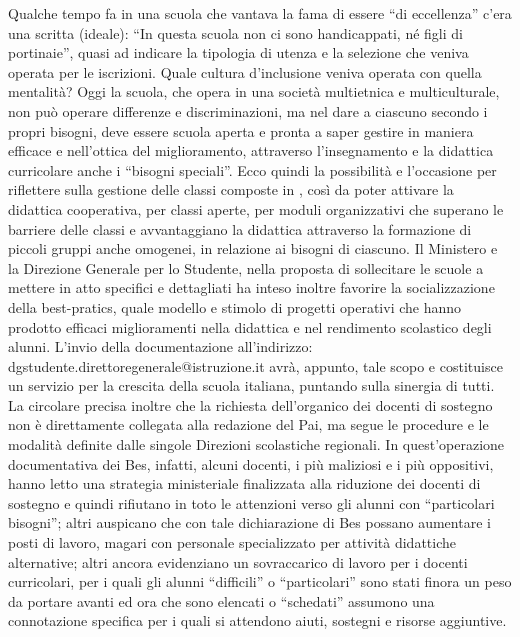 Qualche tempo fa in una scuola che vantava la fama di essere “di eccellenza” c'era una scritta (ideale): “In questa scuola non ci sono handicappati, né figli di portinaie”, quasi ad indicare la tipologia di utenza e la selezione che veniva operata per le iscrizioni. Quale cultura d'inclusione veniva operata con quella mentalità?
Oggi la scuola, che opera in una società multietnica e multiculturale, non può operare differenze e discriminazioni, ma nel dare a ciascuno secondo i propri bisogni, deve essere scuola aperta e pronta a saper gestire in maniera efficace e nell'ottica del miglioramento, attraverso l'insegnamento e la didattica curricolare anche i “bisogni speciali”.
Ecco quindi la possibilità e l'occasione per riflettere sulla gestione delle classi composte in , così da poter attivare la didattica cooperativa, per classi aperte, per moduli organizzativi che superano le barriere delle classi e avvantaggiano la didattica attraverso la formazione di piccoli gruppi anche omogenei, in relazione ai bisogni di ciascuno.
Il Ministero e la Direzione Generale per lo Studente, nella proposta di sollecitare le scuole a mettere in atto specifici e dettagliati  ha inteso inoltre favorire la socializzazione della best-pratics, quale modello e stimolo di progetti operativi che hanno prodotto efficaci miglioramenti nella didattica e nel rendimento scolastico degli alunni. L'invio della documentazione all'indirizzo: dgstudente.direttoregenerale@istruzione.it avrà, appunto, tale scopo e costituisce un servizio per la crescita della scuola italiana, puntando sulla sinergia di tutti.
La circolare precisa inoltre che la richiesta dell'organico dei docenti di sostegno non è direttamente collegata alla redazione del Pai, ma segue le procedure e le modalità definite dalle singole Direzioni scolastiche regionali.
In quest'operazione documentativa dei Bes, infatti, alcuni docenti, i più maliziosi e i più oppositivi, hanno letto una strategia ministeriale finalizzata alla riduzione dei docenti di sostegno e quindi rifiutano in toto le attenzioni verso gli alunni con “particolari bisogni”; altri auspicano che con tale dichiarazione di Bes possano aumentare i posti di lavoro, magari con personale specializzato per attività didattiche alternative; altri ancora evidenziano un sovraccarico di lavoro per i docenti curricolari, per i quali gli alunni “difficili” o “particolari” sono stati finora un peso da portare avanti ed ora che sono elencati o “schedati” assumono una connotazione specifica per i quali si attendono aiuti, sostegni e risorse aggiuntive.
